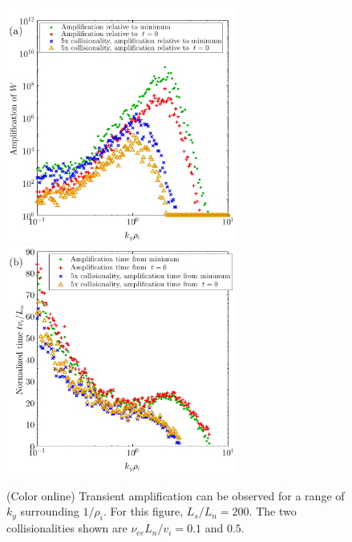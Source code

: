 \documentclass[12pt,superscriptaddress]{revtex4}
\newcommand{\nuee}{\nu_{ee}}
\begin{document}
\begin{figure}[h!]
\includegraphics[width=3in]{m20141122_01_plotTransientAmplificationKyScans.pdf}
\includegraphics[width=3in]{m20141122_01_plotTransientAmplificationKyScans_times.pdf}
\caption{(Color online) Transient amplification can be observed
for a range of $k_y$ surrounding $1/\rho_i$.  For this figure, $L_s/L_n=200$.
The two collisionalities shown are $\nuee L_n / v_i = 0.1$ and $0.5$.
\label{fig:transientAmplificationVsKy}}
\end{figure}
\end{document}
